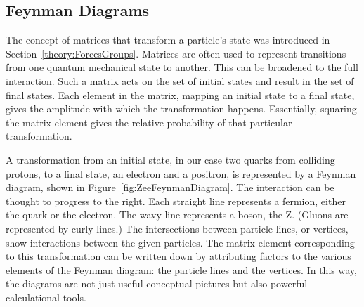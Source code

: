 \subsection{Feynman Diagrams}
\label{theory:feynman}

The concept of matrices that 
transform a particle's state 
was introduced in Section~\ref{theory:ForcesGroups}. 
Matrices are often used to represent transitions 
from one quantum mechanical state to another.  
This can be broadened to the full interaction.  
Such a matrix acts on the set of initial states 
and result in the set of final states.  
Each element in the matrix, mapping an initial state 
to a final state, 
gives the amplitude with which the %
transformation happens.  
Essentially, squaring the matrix element gives the 
relative probability of that particular transformation.  

A transformation from an initial state, 
in our case two quarks from colliding protons, 
to a final state, 
an electron and a positron, 
is represented by a Feynman diagram, 
shown in Figure~\ref{fig:ZeeFeynmanDiagram}.  
The interaction can be thought to progress to the right.  
Each straight line represents a fermion, 
either the quark or the electron.  
The wavy line represents a boson, the Z.  
(Gluons are represented by curly lines.)  
The intersections between particle lines, or vertices, 
show interactions between the given particles.  
The matrix element corresponding to this transformation 
can be written down 
by attributing factors to the various elements 
of the Feynman diagram: 
the particle lines and the vertices.  
In this way, the diagrams are not just useful 
conceptual pictures 
but also powerful calculational tools.  


